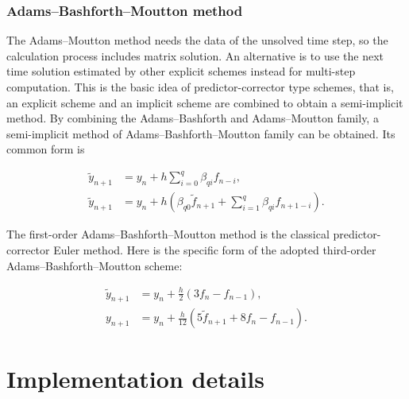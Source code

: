 \documentclass{article}
\begin{document}
\subsubsection{Adams--Bashforth--Moutton method}

The Adams--Moutton method needs the data of the unsolved time step, so the calculation process includes matrix solution. An alternative is to use the next time solution estimated by other explicit schemes instead for multi-step computation. This is the basic idea of predictor-corrector type schemes, that is, an explicit scheme and an implicit scheme are combined to obtain a semi-implicit method. By combining the Adams--Bashforth and Adams--Moutton family, a semi-implicit method of Adams--Bashforth--Moutton family can be obtained. Its common form is

\begin{equation}
  \begin{aligned}
    \widetilde{y}_{n+1} &= y_n + h \sum_{i=0}^q \beta_{qi} f_{n-i}, \\
    \widetilde{y}_{n+1} &= y_n + h \left( \beta_{q0} \widetilde{f}_{n+1} + \sum_{i=1}^q \beta_{qi} f_{n+1-i} \right).
  \end{aligned}
\end{equation}

The first-order Adams--Bashforth--Moutton method is the classical predictor-corrector Euler method. Here is the specific form of the adopted third-order Adams--Bashforth--Moutton scheme:

\begin{equation}
  \begin{aligned}
    \widetilde{y}_{n+1} &= y_n + \frac{h}{2} (3f_n - f_{n-1}), \\
    y_{n+1} &= y_n + \frac{h}{12} (5\widetilde{f}_{n+1} + 8f_n - f_{n-1}).
  \end{aligned}
\end{equation}


\section{Implementation details}
\label{sec:implement}
\end{document}
